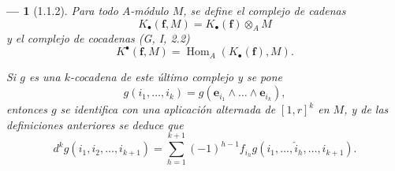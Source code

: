 \documentclass[10pt,oneside,openany]{book}
\theoremstyle{egaenv}\newtheorem*{env}{---}
\theoremstyle{egastatement}
\theoremstyle{egadescription}
\newcommand{\oldpage}[2][]{\marginnote{\normalfont\scriptsize\textbf{#1}\,|\,#2}\ignorespaces}
\begin{document}
\begin{env}[1.1.2]
\label{III.1.1.2}
\label{III.1.1.2-fr}
Para todo $A$-módulo $M$, se define el \emph{complejo de cadenas}
\begin{equation}
\label{III.1.1.2.1-fr}
\tag{1.1.2.1}
K_\bullet(\mathbf f,M)=K_\bullet(\mathbf f)\otimes_A M
\end{equation}
y el \emph{complejo de cocadenas} (G, I, 2.2)
\begin{equation}
\label{III.1.1.2.2-fr}
\tag{1.1.2.2}
K^\bullet(\mathbf f,M)=\operatorname{Hom}_A(K_\bullet(\mathbf f),M).
\end{equation}

Si $g$ es una $k$-cocadena de este último complejo y se pone
\[
g(i_1,\ldots,i_k)=g(\mathbf e_{i_1}\wedge\ldots\wedge\mathbf e_{i_k}),
\]
entonces $g$ se identifica con una aplicación \emph{alternada} de $[1,r]^k$ en $M$, y de las definiciones anteriores se deduce que
\begin{equation}
\label{III.1.1.2.3-fr}
\tag{1.1.2.3}
d^kg(i_1,i_2,\ldots,i_{k+1})=
\sum_{h=1}^{k+1}(-1)^{h-1}f_{i_h}
g(i_1,\ldots,\widehat{i}_h,\ldots,i_{k+1}).
\end{equation}
\end{env}

\oldpage[III]{83}
\end{document}
